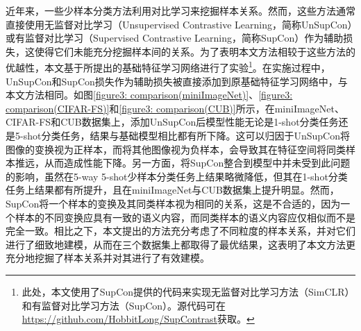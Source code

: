 近年来，一些少样本分类方法利用对比学习来挖掘样本关系。然而，这些方法通常直接使用无监督对比学习（Unsupervised Contrastive Learning，简称UnSupCon）\cite{SimCLR}或有监督对比学习（Supervised Contrastive Learning，简称SupCon）\cite{SupCon}作为辅助损失，这使得它们未能充分挖掘样本间的关系。为了表明本文方法相较于这些方法的优越性，本文基于所提出的基础特征学习网络进行了实验\footnote{此处，本文使用了SupCon提供的代码来实现无监督对比学习方法（SimCLR）和有监督对比学习方法（SupCon）。源代码可在\href{https://github.com/HobbitLong/SupContrast}{https://github.com/HobbitLong/SupContrast}获取。}。在实施过程中，UnSupCon和SupCon损失作为辅助损失被直接添加到原基础特征学习网络中，与本文方法相同。如图\ref{figure3: comparison(miniImageNet)}、\ref{figure3: comparison(CIFAR-FS)}和\ref{figure3: comparison(CUB)}所示，在miniImageNet、CIFAR-FS和CUB数据集上，添加UnSupCon后模型性能无论是1-shot分类任务还是5-shot分类任务，结果与基础模型相比都有所下降。这可以归因于UnSupCon将图像的变换视为正样本，而将其他图像视为负样本，会导致其在特征空间将同类样本推远，从而造成性能下降。另一方面，将SupCon整合到模型中并未受到此问题的影响，虽然在5-way 5-shot少样本分类任务上结果略微降低，但其在1-shot分类任务上结果都有所提升，且在miniImageNet与CUB数据集上提升明显。然而，SupCon将一个样本的变换及其同类样本视为相同的关系，这是不合适的，因为一个样本的不同变换应具有一致的语义内容，而同类样本的语义内容应仅相似而不是完全一致。相比之下，本文提出的方法充分考虑了不同粒度的样本关系，并对它们进行了细致地建模，从而在三个数据集上都取得了最优结果，这表明了本文方法更充分地挖掘了样本关系并对其进行了有效建模。


